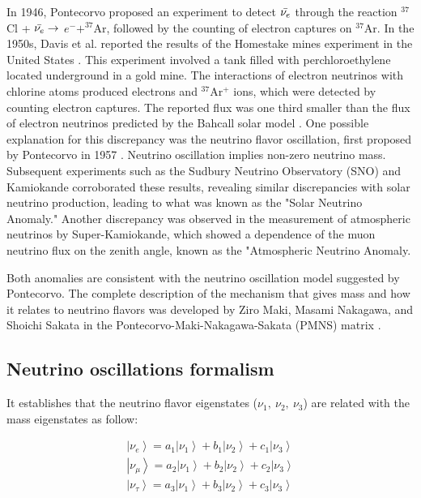 In 1946, Pontecorvo proposed an experiment to detect $\Bar{\nu_e}$  through the reaction $^{37}$Cl + $\Bar{\nu_e} \rightarrow$ $e^- + ^{37}$Ar, followed by the counting of electron captures on $^{37}$Ar. In the 1950s, Davis et al. reported the results of the Homestake mines experiment in the United States \cite{PhysRev.86.976, PhysRev.97.766}. This experiment involved a tank filled with perchloroethylene located underground in a gold mine. The interactions of electron neutrinos with chlorine atoms produced electrons and $^{37}$Ar$^+$ ions, which were detected by counting electron captures. The reported flux was one third smaller than the flux of electron neutrinos predicted by the Bahcall solar model \cite{SolarModel}. One possible explanation for this discrepancy was the neutrino flavor oscillation, first proposed by Pontecorvo in 1957 \cite{Pontecorvo:1957cp}. Neutrino oscillation implies non-zero neutrino mass. Subsequent experiments such as the Sudbury Neutrino Observatory (SNO) and Kamiokande corroborated these results, revealing similar discrepancies with solar neutrino production, leading to what was known as the "Solar Neutrino Anomaly." Another discrepancy was observed in the measurement of atmospheric neutrinos by Super-Kamiokande, which showed a dependence of the muon neutrino flux on the zenith angle, known as the "Atmospheric Neutrino Anomaly.

Both anomalies are consistent with the neutrino oscillation model suggested by Pontecorvo. The complete description of the mechanism that gives mass and how it relates to neutrino flavors was developed by Ziro Maki, Masami Nakagawa, and Shoichi Sakata in the Pontecorvo-Maki-Nakagawa-Sakata (PMNS) matrix \cite{10.1143/PTP.28.870}. 

\subsection{Neutrino oscillations formalism}
It establishes that the neutrino flavor eigenstates ($\nu_1,\ \nu_2,\ \nu_3$) are related with the mass eigenstates as follow:

\begin{equation}
    \begin{split}
        \left|\nu_e\right> = a_1\left|\nu_1\right> + b_1\left|\nu_2\right> + c_1\left|\nu_3\right>\\
        \left|\nu_\mu\right> = a_2\left|\nu_1\right> + b_2\left|\nu_2\right> + c_2\left|\nu_3\right>\\
        \left|\nu_\tau\right> = a_3\left|\nu_1\right> + b_3\left|\nu_2\right> + c_3\left|\nu_3\right>
    \end{split}   
    \label{eq:MassEigenstatesSum}
\end{equation}

